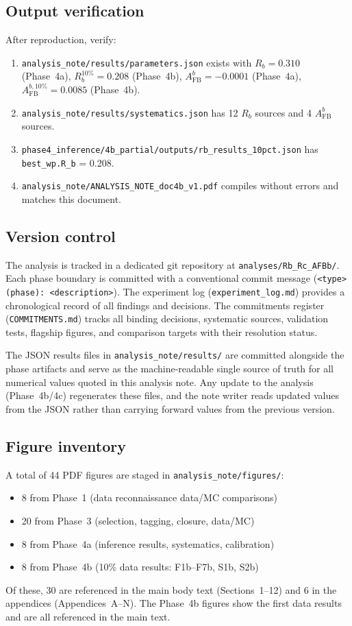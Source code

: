 \documentclass[11pt,a4paper]{article}
\begin{document}
\subsection{Output verification}

After reproduction, verify:
\begin{enumerate}
\item \texttt{analysis\_note/results/parameters.json} exists with
$R_b = 0.310$ (Phase~4a), $R_b^{10\%} = 0.208$ (Phase~4b),
$A_\mathrm{FB}^b = -0.0001$ (Phase~4a), $A_\mathrm{FB}^{b,10\%} = 0.0085$ (Phase~4b).
\item \texttt{analysis\_note/results/systematics.json} has 12 $R_b$ sources
and 4 $A_\mathrm{FB}^b$ sources.
\item \texttt{phase4\_inference/4b\_partial/outputs/rb\_results\_10pct.json} has
\texttt{best\_wp.R\_b} = 0.208.
\item \texttt{analysis\_note/ANALYSIS\_NOTE\_doc4b\_v1.pdf} compiles without
errors and matches this document.
\end{enumerate}

\subsection{Version control}

The analysis is tracked in a dedicated git repository at
\texttt{analyses/Rb\_Rc\_AFBb/}. Each phase boundary is committed with a
conventional commit message (\texttt{<type>(phase): <description>}). The
experiment log (\texttt{experiment\_log.md}) provides a chronological record
of all findings and decisions. The commitments register (\texttt{COMMITMENTS.md})
tracks all binding decisions, systematic sources, validation tests, flagship
figures, and comparison targets with their resolution status.

The JSON results files in \texttt{analysis\_note/results/} are committed alongside
the phase artifacts and serve as the machine-readable single source of truth for
all numerical values quoted in this analysis note. Any update to the analysis
(Phase~4b/4c) regenerates these files, and the note writer reads updated values
from the JSON rather than carrying forward values from the previous version.

\subsection{Figure inventory}

A total of 44 PDF figures are staged in \texttt{analysis\_note/figures/}:
\begin{itemize}
\item 8 from Phase~1 (data reconnaissance data/MC comparisons)
\item 20 from Phase~3 (selection, tagging, closure, data/MC)
\item 8 from Phase~4a (inference results, systematics, calibration)
\item 8 from Phase~4b (10\% data results: F1b--F7b, S1b, S2b)
\end{itemize}

Of these, 30 are referenced in the main body text (Sections~1--12) and 6 in
the appendices (Appendices~A--N). The Phase~4b figures show the first data results
and are all referenced in the main text.
\end{document}
